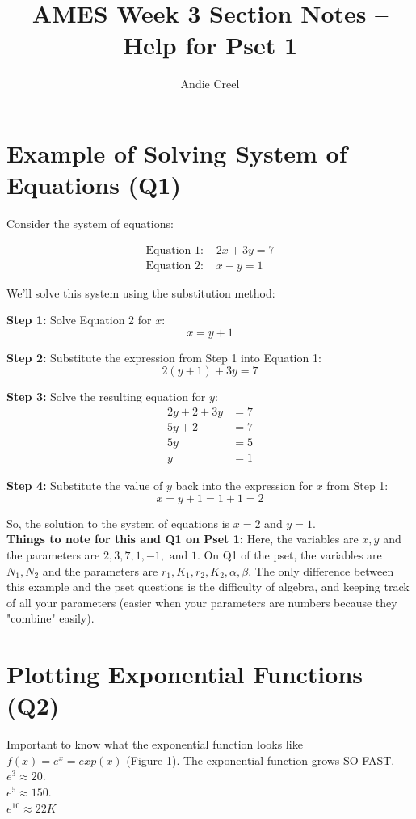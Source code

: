 \documentclass{article}
\title{AMES Week 3 Section Notes -- Help for Pset 1}
\author{Andie Creel}
\begin{document}
\maketitle

\section{Example of Solving System of Equations (Q1)}
Consider the system of equations:

\begin{align*}
\text{Equation 1: } & 2x + 3y = 7 \\
\text{Equation 2: } & x - y = 1
\end{align*}

We'll solve this system using the substitution method:

\textbf{Step 1:} Solve Equation 2 for \(x\):
\[x = y + 1\]

\textbf{Step 2:} Substitute the expression from Step 1 into Equation 1:
\[2(y + 1) + 3y = 7\]

\textbf{Step 3:} Solve the resulting equation for \(y\):
\begin{align*}
2y + 2 + 3y &= 7 \\
5y + 2 &= 7 \\
5y &= 5 \\
y &= 1
\end{align*}

\textbf{Step 4:} Substitute the value of \(y\) back into the expression for \(x\) from Step 1:
\[x = y + 1 = 1 + 1 = 2\]

So, the solution to the system of equations is \(x = 2\) and \(y = 1\).\\

\textbf{Things to note for this and Q1 on Pset 1:} Here, the variables are $x,y$ and the parameters are $2,3,7, 1, -1, \text{ and } 1$. On Q1 of the pset, the variables are $N_1, N_2$ and the parameters are $r_1, K_1, r_2, K_2, \alpha, \beta$. The only difference between this example and the pset questions is the difficulty of algebra, and keeping track of all your parameters (easier when your parameters are numbers because they "combine" easily). 

\section{Plotting Exponential Functions (Q2)}

Important to know what the exponential function looks like $f(x) = e^x = exp(x)$ (Figure 1). The exponential function grows SO FAST. \\ $e^3 \approx 20$.\\ $e^5 \approx 150 $.\\ $e^{10} \approx 22K$ \\
\end{document}
